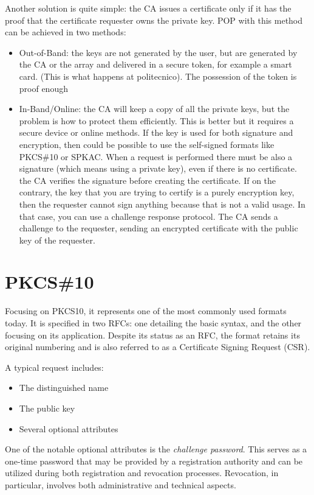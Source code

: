 Another solution is quite simple: the CA issues a certificate only if
it has the proof that the certificate requester owns the private key.
POP with this method can be achieved in two methods:
\begin{itemize}
  \item Out-of-Band: the keys are not generated by the user, but are
    generated by the CA or the array and delivered in a secure token,
    for example a smart card. (This is what happens at politecnico).
    The possession of the token is proof enough
  \item In-Band/Online: the CA will keep a copy of all the private keys, but
    the problem is how to protect them efficiently. This is better but
    it requires a secure device or online methods. If the key is used
    for both signature and encryption, then could be possible to use
    the self-signed formats like PKCS\#10 or SPKAC.  When a request is
    performed there must be also a signature (which means using a
    private key), even if there is no certificate. the CA verifies the
    signature before creating the certificate. If on the contrary, the
    key that you are trying to certify is a purely encryption key,
    then the requester cannot sign anything because that is not a
    valid usage. In that case, you can use a challenge response
    protocol. The CA sends a challenge to the requester, sending an
    encrypted certificate with the public key of the requester. 
\end{itemize}

\section{PKCS\#10}

Focusing on PKCS10, it represents one of the most commonly used
formats today. It is specified in two RFCs: one detailing the basic
syntax, and the other focusing on its application. Despite its status
as an RFC, the format retains its original numbering and is also
referred to as a Certificate Signing Request (CSR).

A typical request includes:
\begin{itemize}
  \item The distinguished name
  \item The public key
  \item Several optional attributes
\end{itemize}

One of the notable optional attributes is the \textit{challenge
password}. This serves as a one-time password that may be provided by a
registration authority and can be utilized during both registration and
revocation processes. Revocation, in particular, involves both
administrative and technical aspects.

